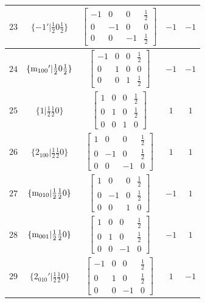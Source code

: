 \documentclass[fleqn,8pt]{jsarticle}
\begin{document}
\begin{longtable}{ccccc}
$ 23 $ & $ \{-1{}'|\frac{1}{2} 0 \frac{1}{2}\} $ & $ \begin{bmatrix} -1 & 0 & 0 & \frac{1}{2} \\ 0 & -1 & 0 & 0 \\ 0 & 0 & -1 & \frac{1}{2} \end{bmatrix} $ & $ -1 $ & $ -1 $ \\ \hline
$ 24 $ & $ \{{\rm m}_{100}{}'|\frac{1}{2} 0 \frac{1}{2}\} $ & $ \begin{bmatrix} -1 & 0 & 0 & \frac{1}{2} \\ 0 & 1 & 0 & 0 \\ 0 & 0 & 1 & \frac{1}{2} \end{bmatrix} $ & $ -1 $ & $ -1 $ \\ \hline
$ 25 $ & $ \{1|\frac{1}{2} \frac{1}{2} 0\} $ & $ \begin{bmatrix} 1 & 0 & 0 & \frac{1}{2} \\ 0 & 1 & 0 & \frac{1}{2} \\ 0 & 0 & 1 & 0 \end{bmatrix} $ & $ 1 $ & $ 1 $ \\ \hline
$ 26 $ & $ \{2{}_{100}|\frac{1}{2} \frac{1}{2} 0\} $ & $ \begin{bmatrix} 1 & 0 & 0 & \frac{1}{2} \\ 0 & -1 & 0 & \frac{1}{2} \\ 0 & 0 & -1 & 0 \end{bmatrix} $ & $ 1 $ & $ 1 $ \\ \hline
$ 27 $ & $ \{{\rm m}_{010}|\frac{1}{2} \frac{1}{2} 0\} $ & $ \begin{bmatrix} 1 & 0 & 0 & \frac{1}{2} \\ 0 & -1 & 0 & \frac{1}{2} \\ 0 & 0 & 1 & 0 \end{bmatrix} $ & $ -1 $ & $ 1 $ \\ \hline
$ 28 $ & $ \{{\rm m}_{001}|\frac{1}{2} \frac{1}{2} 0\} $ & $ \begin{bmatrix} 1 & 0 & 0 & \frac{1}{2} \\ 0 & 1 & 0 & \frac{1}{2} \\ 0 & 0 & -1 & 0 \end{bmatrix} $ & $ -1 $ & $ 1 $ \\ \hline
$ 29 $ & $ \{2{}_{010}{}'|\frac{1}{2} \frac{1}{2} 0\} $ & $ \begin{bmatrix} -1 & 0 & 0 & \frac{1}{2} \\ 0 & 1 & 0 & \frac{1}{2} \\ 0 & 0 & -1 & 0 \end{bmatrix} $ & $ 1 $ & $ -1 $ \\ \hline

\end{longtable}
\end{document}
